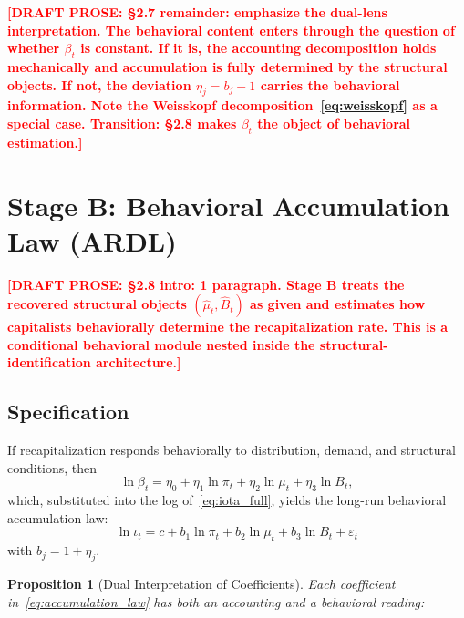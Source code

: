 \documentclass[12pt,letterpaper]{article}
\newcommand{\mut}{\mu_t}           %
\newcommand{\pit}{\pi_t}           %
\newcommand{\iotat}{\iota_t}       %
\newcommand{\betat}{\beta_t}       %
\newcommand{\Bt}{B_t}              %
\newcommand{\draftnote}[1]{%
  \textcolor{red}{\textbf{[DRAFT PROSE: #1]}}}
\newtheorem{proposition}{Proposition}[section]
\begin{document}
\draftnote{§2.7 remainder: emphasize the dual-lens interpretation.
  The behavioral content enters through the question of whether $\betat$ is
  constant. If it is, the accounting decomposition holds mechanically and
  accumulation is fully determined by the structural objects. If not,
  the deviation $\eta_j = b_j - 1$ carries the behavioral information.
  Note the Weisskopf decomposition~\eqref{eq:weisskopf} as a special case.
  Transition: §2.8 makes $\betat$ the object of behavioral estimation.}


\section{Stage B: Behavioral Accumulation Law (ARDL)}
\label{sec:stageB}

\draftnote{§2.8 intro: 1 paragraph. Stage B treats the recovered structural
  objects $(\hat{\mu}_t, \hat{B}_t)$ as given and estimates how capitalists
  behaviorally determine the recapitalization rate. This is a conditional
  behavioral module nested inside the structural-identification architecture.}


\subsection{Specification}
\label{sec:stageB_spec}

If recapitalization responds behaviorally to distribution, demand, and
structural conditions, then
\begin{equation}
  \ln\betat = \eta_0 + \eta_1\ln\pit + \eta_2\ln\mut + \eta_3\ln\Bt,
  \label{eq:beta_behavioral}
\end{equation}
which, substituted into the log of~\eqref{eq:iota_full}, yields the
long-run behavioral accumulation law:
\begin{equation}
  \boxed{
  \ln\iotat = c + b_1\ln\pit + b_2\ln\mut + b_3\ln\Bt + \varepsilon_t
  }
  \label{eq:accumulation_law}
\end{equation}
with $b_j = 1 + \eta_j$.

\begin{proposition}[Dual Interpretation of Coefficients]
\label{prop:dual}
Each coefficient in~\eqref{eq:accumulation_law} has both an accounting
and a behavioral reading:
\end{proposition}
\end{document}
